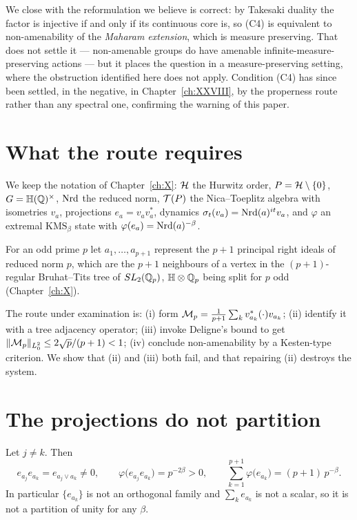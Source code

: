\begin{summary}
We close with the reformulation we believe is correct: by Takesaki duality the factor is
injective if and only if its continuous core is, so (C4) is equivalent to non-amenability of
the \emph{Maharam extension}, which is measure preserving. That does not settle it --- non-amenable groups do have
amenable infinite-measure-preserving actions --- but it places the question in a
measure-preserving setting, where the obstruction identified here does not apply.
Condition (C4) has since been settled, in the negative, in Chapter~\ref{ch:XXVIII},
by the properness route rather than any spectral one, confirming the warning of this paper.
\end{summary}


\section{What the route requires}

We keep the notation of Chapter~\ref{ch:X}: $\mathcal{H}$ the Hurwitz order, $P=\mathcal{H}\setminus\{0\}$,
$G=\mathbb{H}(\mathbb{Q})^\times$, $\operatorname{Nrd}$ the reduced norm, $\mathcal{T}(P)$ the Nica--Toeplitz algebra with
isometries $v_a$, projections $e_a=v_av_a^*$, dynamics $\sigma_t(v_a)=\operatorname{Nrd}(a)^{it}v_a$, and
$\varphi$ an extremal $\mathrm{KMS}_\beta$ state with $\varphi(e_a)=\operatorname{Nrd}(a)^{-\beta}$.

For an odd prime $p$ let $a_1,\dots,a_{p+1}$ represent the $p+1$ principal right ideals of
reduced norm $p$, which are the $p+1$ neighbours of a vertex in the $(p+1)$-regular
Bruhat--Tits tree of $SL_2(\mathbb{Q}_p)$, $\mathbb{H}\otimes\mathbb{Q}_p$ being split for $p$ odd (Chapter~\ref{ch:X}).

The route under examination is: (i) form
$\mathcal{M}_p=\frac{1}{p+1}\sum_kv_{a_k}^*(\cdot)v_{a_k}$; (ii) identify it with a tree adjacency
operator; (iii) invoke Deligne's bound to get
$\|\mathcal{M}_p\|_{L^2_0}\le2\sqrt p/(p+1)<1$; (iv) conclude non-amenability by a Kesten-type
criterion. We show that (ii) and (iii) both fail, and that repairing (ii) destroys the
system.

\section{The projections do not partition}

\begin{proposition}\label{XI:prop:nested}
Let $j\ne k$. Then
\[
e_{a_j}e_{a_k}=e_{a_j\vee a_k}\ne0,\qquad
\varphi\bigl(e_{a_j}e_{a_k}\bigr)=p^{-2\beta}>0,
\qquad
\sum_{k=1}^{p+1}\varphi\bigl(e_{a_k}\bigr)=(p+1)\,p^{-\beta}.
\]
In particular $\{e_{a_k}\}$ is not an orthogonal family and $\sum_ke_{a_k}$ is not a scalar,
so it is not a partition of unity for any $\beta$.
\end{proposition}

